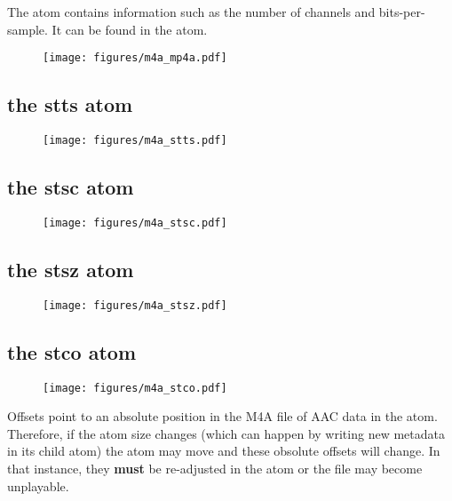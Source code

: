 The  atom contains information such as the number of channels
and bits-per-sample.  It can be found in the  atom.

\begin{figure}[h]
\texttt{[image: figures/m4a\_mp4a.pdf]}
\end{figure}

\pagebreak

\subsection{the stts atom}

\begin{figure}[h]
\texttt{[image: figures/m4a\_stts.pdf]}
\end{figure}

\subsection{the stsc atom}

\begin{figure}[h]
\texttt{[image: figures/m4a\_stsc.pdf]}
\end{figure}

\subsection{the stsz atom}

\begin{figure}[h]
\texttt{[image: figures/m4a\_stsz.pdf]}
\end{figure}

\pagebreak

\subsection{the stco atom}

\begin{figure}[h]
\texttt{[image: figures/m4a\_stco.pdf]}
\end{figure}
\par
\noindent
Offsets point to an absolute position in the M4A file of AAC data in
the  atom.  Therefore, if the  atom size changes
(which can happen by writing new metadata in its  child atom)
the  atom may move and these obsolute offsets will change.
In that instance, they \textbf{must}
be re-adjusted in the  atom or the file may become unplayable.

